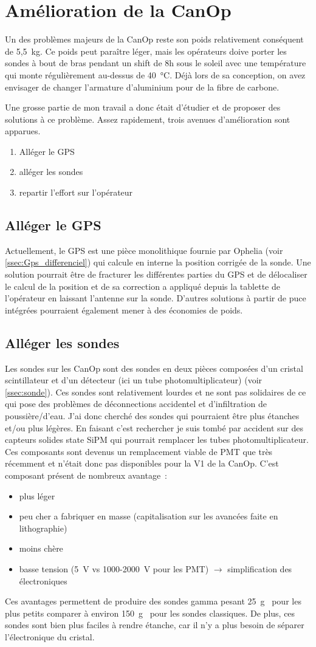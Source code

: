 \section{Amélioration de la CanOp}

Un des problèmes majeurs de la CanOp reste son poids relativement conséquent de 5,5~kg. Ce poids peut paraître léger, mais les opérateurs doive porter les sondes à bout de bras pendant un shift de 8h sous le soleil avec une température qui monte régulièrement au-dessus de 40~°C. Déjà lors de sa conception, on avez envisager de changer l'armature d'aluminium pour de la fibre de carbone. 

Une grosse partie de mon travail a donc était d'étudier et de proposer des solutions à ce problème. Assez rapidement, trois avenues d'amélioration sont apparues.
\begin{enumerate}
    \item Alléger le GPS 
    \item alléger les sondes
    \item repartir l'effort sur l'opérateur
\end{enumerate}

\subsection{Alléger le GPS}
Actuellement, le GPS est une pièce monolithique fournie par Ophelia (voir \cref{ssec:Gps_differenciel}) qui calcule en interne la position corrigée de la sonde. Une solution pourrait être de fracturer les différentes parties du GPS et de délocaliser le calcul de la position et de sa correction a appliqué depuis la tablette de l'opérateur en laissant l'antenne sur la sonde. D'autres solutions à partir de puce intégrées pourraient également mener à des économies de poids.

\subsection{Alléger les sondes}
Les sondes sur les CanOp sont des sondes en deux pièces composées d'un cristal scintillateur et d'un détecteur (ici un tube photomultiplicateur) (voir \cref{ssec:sonde}). Ces sondes sont relativement lourdes et ne sont pas solidaires de ce qui pose des problèmes de déconnections accidentel et d'infiltration de poussière/d'eau. 
J'ai donc cherché des sondes qui pourraient être plus étanches et/ou plus légères. En faisant c'est rechercher je suis tombé par accident sur des capteurs solides state SiPM qui pourrait remplacer les tubes photomultiplicateur. Ces composants sont devenus un remplacement viable de PMT que très récemment et n'était donc pas disponibles pour la V1 de la CanOp. C'est composant présent de nombreux avantage~:
\begin{itemize}
    \item plus léger
    \item peu cher a fabriquer en masse (capitalisation sur les avancées faite en lithographie)
    \item moins chère
    \item basse tension (5~V vs 1000-2000~V pour les PMT) $\rightarrow$ simplification des électroniques
\end{itemize}

Ces avantages permettent de produire des sondes gamma pesant 25~g~\cite{} pour les plus petits comparer à environ 150~g~\cite{} pour les sondes classiques. De plus, ces sondes sont bien plus faciles à rendre étanche, car il n'y a plus besoin de séparer l'électronique du cristal.
